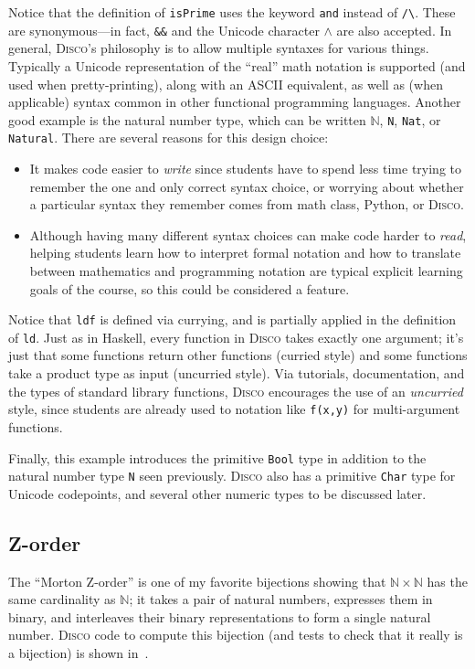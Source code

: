 \documentclass[submission,copyright,creativecommons]{eptcs}
\newcommand{\disco}{\textsc{Disco}\xspace}
\newcommand{\pref}[1]{\prettyref{#1}}
\newcommand{\N}{\mathbb{N}}
\begin{document}
Notice that the definition of \verb|isPrime| uses the keyword
\verb|and| instead of \verb|/\|.  These are synonymous---in fact,
\verb|&&| and the Unicode character $\land$ are also accepted.  In
general, \disco's philosophy is to allow multiple syntaxes for various
things.  Typically a Unicode representation of the ``real'' math
notation is supported (and used when pretty-printing), along with an
ASCII equivalent, as well as (when applicable) syntax common in other
functional programming languages.  Another good example is the natural
number type, which can be written $\N$, \verb|N|, \verb|Nat|, or
\verb|Natural|.  There are several reasons for this design choice:
\begin{itemize}
\item It makes code easier to \emph{write} since students have to
  spend less time trying to remember the one and only correct syntax
  choice, or worrying about whether a particular syntax they remember
  comes from math class, Python, or \disco.
\item Although having many different syntax choices can make code
  harder to \emph{read}, helping students learn how to interpret
  formal notation and how to translate between mathematics and
  programming notation are typical explicit learning goals of the
  course, so this could be considered a feature.
\end{itemize}

Notice that \verb|ldf| is defined via currying, and is partially
applied in the definition of \verb|ld|. Just as in Haskell, every
function in \disco takes exactly one argument; it's just that some
functions return other functions (curried style) and some functions
take a product type as input (uncurried style).  Via tutorials,
documentation, and the types of standard library functions, \disco
encourages the use of an \emph{uncurried} style, since students are
already used to notation like \verb|f(x,y)| for multi-argument
functions.

Finally, this example introduces the primitive \verb|Bool| type in
addition to the natural number type \verb|N| seen previously.  \disco
also has a primitive \verb|Char| type for Unicode codepoints, and
several other numeric types to be discussed later.

\subsection{Z-order}
\label{sec:zorder}

The ``Morton Z-order'' is one of my favorite bijections showing that
$\N \times \N$ has the same cardinality as $\N$; it takes a pair of
natural numbers, expresses them in binary, and interleaves their
binary representations to form a single natural number.  \disco code
to compute this bijection (and tests to check that it really is a
bijection) is shown in~\pref{lst:zorder}.
\end{document}
